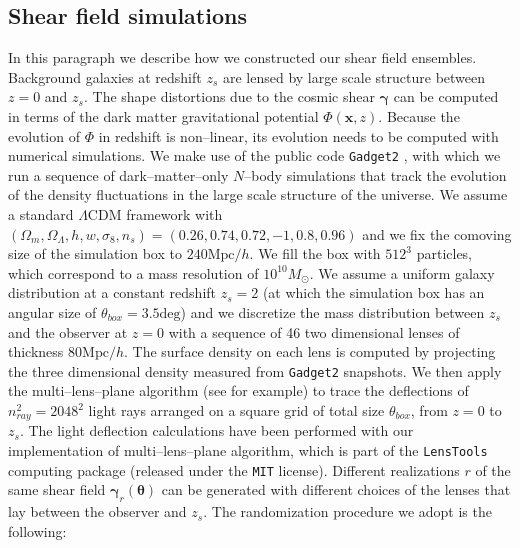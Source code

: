 \documentclass[reprint,aps,prd,superscriptaddress,showkeys,showpacs]{revtex4-1}
\newcommand{\bb}[1]{\mathbf{#1}}
\begin{document}
\subsection{Shear field simulations}
\label{shearsim}
%
In this paragraph we describe how we constructed our shear field ensembles. Background galaxies at redshift $z_s$ are lensed by large scale structure between $z=0$ and $z_s$. The shape distortions due to the cosmic shear $\pmb{\gamma}$ can be computed in terms of the dark matter gravitational potential $\Phi(\bb{x},z)$. Because the evolution of $\Phi$ in redshift is non--linear, its evolution needs to be computed with numerical simulations. We make use of the public code \texttt{Gadget2} \citep{Gadget2}, with which we run a sequence of dark--matter--only $N$--body simulations that track the evolution of the density fluctuations in the large scale structure of the universe. We assume a standard $\Lambda$CDM framework with $(\Omega_m,\Omega_\Lambda,h,w,\sigma_8,n_s)=(0.26,0.74,0.72,-1,0.8,0.96)$ and we fix the comoving size of the simulation box to $240\mathrm{Mpc}/h$. We fill the box with $512^3$ particles, which correspond to a mass resolution of $10^{10}M_\odot$. We assume a uniform galaxy distribution at a constant redshift $z_s=2$ (at which the simulation box has an angular size of $\theta_{box}=3.5\mathrm{deg}$) and we discretize the mass distribution between $z_s$ and the observer at $z=0$ with a sequence of 46 two dimensional lenses of thickness $80\mathrm{Mpc}/h$. The surface density on each lens is computed by projecting the three dimensional density measured from \texttt{Gadget2} snapshots. We then apply the multi--lens--plane algorithm (see \citep{RayTracingHartlap,RayTracingJain} for example) to trace the deflections of $n_{ray}^2=2048^2$ light rays arranged on a square grid of total size $\theta_{box}$, from $z=0$ to $z_s$. The light deflection calculations have been performed with our implementation of multi--lens--plane algorithm, which is part of the \texttt{LensTools} computing package \citep{LensTools} (released under the \texttt{MIT} license). Different realizations $r$ of the same shear field $\pmb{\gamma}_r(\pmb{\theta})$ can be generated with different choices of the lenses that lay between the observer and $z_s$. The randomization procedure we adopt is the following:
\end{document}
